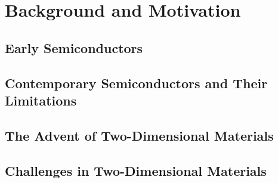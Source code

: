 \graphicspath{{./figs/chap2/}} %

\chapter{Background and Motivation}\label{chap:one}


\section{Early Semiconductors}\label{sec:early_semiconductors}

\section{Contemporary Semiconductors and Their Limitations}\label{sec:contemporary_semiconductors}

\section{The Advent of Two-Dimensional Materials}\label{sec:2d_materials}

\section{Challenges in Two-Dimensional Materials}\label{sec:2d_challenges}




